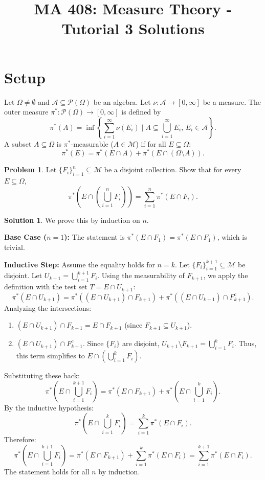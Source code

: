 \documentclass{article}
\title{MA 408: Measure Theory - Tutorial 3 Solutions}
\author{}
\date{}
\theoremstyle{definition}
\newtheorem{problem}{Problem}
\newtheorem*{solution}{Solution}
\newcommand{\M}{\mathcal{M}}
\newcommand{\A}{\mathcal{A}}
\newcommand{\pistar}{\pi^*}
\begin{document}
\maketitle

\section*{Setup}
Let $\Omega \neq \emptyset$ and $\A \subseteq \mathcal{P}(\Omega)$ be an algebra. Let $\nu: \A \to [0, \infty]$ be a measure. The outer measure $\pistar: \mathcal{P}(\Omega) \to [0, \infty]$ is defined by
\[ \pistar(A) = \inf \left\{ \sum_{i=1}^\infty \nu(E_i) \mid A \subseteq \bigcup_{i=1}^\infty E_i, \, E_i \in \A \right\}. \]
A subset $A \subseteq \Omega$ is $\pistar$-measurable ($A \in \M$) if for all $E \subseteq \Omega$:
\[ \pistar(E) = \pistar(E \cap A) + \pistar(E \cap (\Omega \setminus A)). \]

\hrulefill

\begin{problem}
Let $\{F_i\}_{i=1}^n \subseteq \M$ be a disjoint collection. Show that for every $E \subseteq \Omega$,
\[ \pistar\left(E \cap \left(\bigcup_{i=1}^n F_i\right)\right) = \sum_{i=1}^n \pistar(E \cap F_i). \]
\end{problem}

\begin{solution}
We prove this by induction on $n$.

\textbf{Base Case ($n=1$):} The statement is $\pistar(E \cap F_1) = \pistar(E \cap F_1)$, which is trivial.

\textbf{Inductive Step:} Assume the equality holds for $n=k$. Let $\{F_i\}_{i=1}^{k+1} \subseteq \M$ be disjoint. Let $U_{k+1} = \bigcup_{i=1}^{k+1} F_i$.
Using the measurability of $F_{k+1}$, we apply the definition with the test set $T = E \cap U_{k+1}$:
\[ \pistar(E \cap U_{k+1}) = \pistar((E \cap U_{k+1}) \cap F_{k+1}) + \pistar((E \cap U_{k+1}) \cap F_{k+1}^c). \]
Analyzing the intersections:
\begin{enumerate}
    \item $(E \cap U_{k+1}) \cap F_{k+1} = E \cap F_{k+1}$ (since $F_{k+1} \subseteq U_{k+1}$).
    \item $(E \cap U_{k+1}) \cap F_{k+1}^c$. Since $\{F_i\}$ are disjoint, $U_{k+1} \setminus F_{k+1} = \bigcup_{i=1}^k F_i$. Thus, this term simplifies to $E \cap \left(\bigcup_{i=1}^k F_i\right)$.
\end{enumerate}
Substituting these back:
\[ \pistar\left(E \cap \bigcup_{i=1}^{k+1} F_i\right) = \pistar(E \cap F_{k+1}) + \pistar\left(E \cap \bigcup_{i=1}^k F_i\right). \]
By the inductive hypothesis:
\[ \pistar\left(E \cap \bigcup_{i=1}^k F_i\right) = \sum_{i=1}^k \pistar(E \cap F_i). \]
Therefore:
\[ \pistar\left(E \cap \bigcup_{i=1}^{k+1} F_i\right) = \pistar(E \cap F_{k+1}) + \sum_{i=1}^k \pistar(E \cap F_i) = \sum_{i=1}^{k+1} \pistar(E \cap F_i). \]
The statement holds for all $n$ by induction.
\end{solution}
\end{document}
